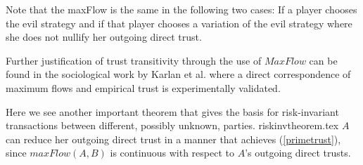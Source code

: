   \noindent Note that the maxFlow is the same in the following two cases: If a player chooses the evil strategy and if that
  player chooses a variation of the evil strategy where she does not nullify her outgoing direct trust.

  Further justification of trust transitivity through the use of $MaxFlow$ can be found in the sociological work by Karlan et
  al. \cite{kmrs} where a direct correspondence of maximum flows and empirical trust is experimentally validated.

  Here we see another important theorem that gives the basis for risk-invariant transactions between different, possibly
  unknown, parties.
  {riskinvtheorem.tex}
  \noindent $A$ can reduce her outgoing direct trust in a manner that achieves (\ref{primetrust}), since
  $maxFlow\left(A, B\right)$ is continuous with respect to $A$'s outgoing direct trusts.
